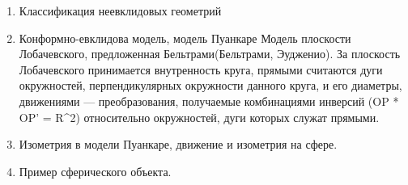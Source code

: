 \begin{enumerate}
        \item Классификация неевклидовых геометрий

        \item Конформно-евклидова модель, модель Пуанкаре
        Модель плоскости Лобачевского, предложенная Бельтрами(Бельтрами, Эудженио).
        За плоскость Лобачевского принимается внутренность круга, прямыми
        считаются дуги окружностей, перпендикулярных окружности данного круга, и
        его диаметры, движениями — преобразования, получаемые комбинациями инверсий
        (OP * OP' = R^2) относительно окружностей, дуги которых служат прямыми.


        \item Изометрия в модели Пуанкаре, движение и изометрия на сфере.

        \item Пример сферического объекта.


    \end{enumerate}



